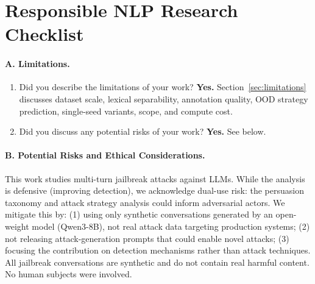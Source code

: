 
\section*{Responsible NLP Research Checklist}

\paragraph{A. Limitations.}
\begin{enumerate}[label=A\arabic*.,leftmargin=2em]
  \item Did you describe the limitations of your work? \textbf{Yes.} Section~\ref{sec:limitations} discusses dataset scale, lexical separability, annotation quality, OOD strategy prediction, single-seed variants, scope, and compute cost.
  \item Did you discuss any potential risks of your work? \textbf{Yes.} See below.
\end{enumerate}

\paragraph{B. Potential Risks and Ethical Considerations.}
This work studies multi-turn jailbreak attacks against LLMs. While the analysis is defensive (improving detection), we acknowledge dual-use risk: the persuasion taxonomy and attack strategy analysis could inform adversarial actors. We mitigate this by: (1) using only synthetic conversations generated by an open-weight model (Qwen3-8B), not real attack data targeting production systems; (2) not releasing attack-generation prompts that could enable novel attacks; (3) focusing the contribution on detection mechanisms rather than attack techniques. All jailbreak conversations are synthetic and do not contain real harmful content. No human subjects were involved.

